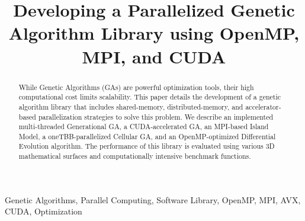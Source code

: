 \documentclass[conference]{IEEEtran}
\begin{document}
    \title{Developing a Parallelized Genetic Algorithm Library using OpenMP, MPI, and CUDA\\}

    \author{
        \and
        \and
        \and
    }

    \maketitle

    \begin{abstract}
        While Genetic Algorithms (GAs) are powerful optimization tools, their high computational cost limits scalability. This paper details the development of a genetic algorithm library that includes shared-memory, distributed-memory, and accelerator-based parallelization strategies to solve this problem. We describe an implemented multi-threaded Generational GA, a CUDA-accelerated GA, an MPI-based Island Model, a oneTBB-parallelized Cellular GA, and an OpenMP-optimized Differential Evolution algorithm. The performance of this library is evaluated using various 3D mathematical surfaces and computationally intensive benchmark functions.
    \end{abstract}

    \begin{IEEEkeywords}
        Genetic Algorithms, Parallel Computing, Software Library, OpenMP, MPI, AVX, CUDA, Optimization
    \end{IEEEkeywords}
\end{document}
